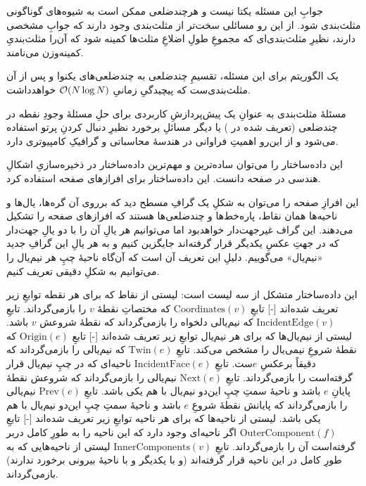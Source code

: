 جوابِ این مسئله یکتا نیست و هرچندضلعی ممکن است به شیوه‌های گوناگونی مثلث‌بندی شود. از این رو مسائلی سخت‌تر از مثلث‌بندی وجود دارند که جوابِ مشخصی دارند، نظیرِ مثلث‌بندی‌ای که مجموعِ طولِ اضلاعِ مثلث‌ها کمینه شود که آن‌را مثلث‌بندیِ کمینه‌وزن می‌نامند.  

 یک الگوریتم برای این مسئله، تقسیمِ چندضلعی به چندضلعی‌های یکنوا و پس از آن مثلث‌بندی‌ست که پیچیدگیِ زمانیِ
$\mathcal{O}(N \log N)$
خواهدداشت.

مسئلهٔ مثلث‌بندی به عنوانِ یک پیش‌پردازشِ کاربردی برای حلِ مسئلهٔ 
وجودِ نقطه در چندضلعی (تعریف شده در ) یا دیگر مسائلِ برخورد نظیرِ دنبال کردنِ پرتو استفاده می‌شود و از این‌رو اهمیتِ فراوانی در هندسهٔ محاسباتی و گرافیکِ کامپیوتری دارد. 


این داده‌ساختار را می‌توان ساده‌ترین و مهم‌ترین داده‌ساختار در ذخیره‌سازیِ اشکالِ هندسی در صفحه دانست. این داده‌ساختار برای افرازهای صفحه استفاده کرد.

این افرازِ صفحه را می‌توان به شکلِ یک گرافِ مسطح دید که برروی آن گره‌ها، یال‌ها و ناحیه‌ها همان نقاط، پاره‌خط‌ها و چندضلعی‌ها هستند که افرازهای صفحه را تشکیل می‌دهند. این گراف غیرجهت‌دار خواهدبود اما می‌توانیم هر یالِ آن را با دو یالِ جهت‌دار که در جهتِ عکسِ یکدیگر قرار گرفته‌اند جایگزین کنیم و به هر یالِ این گرافِ جدید «نیم‌یال» می‌گوییم. دلیلِ این تعریف آن است که آن‌گاه ناحیهٔ چپِ هر نیم‌یال را می‌توانیم به شکلِ دقیقی تعریف کنیم.

این داده‌ساختار متشکل از سه لیست است:
     لیستی از نقاط که برای هر نقطه توابعِ زیر تعریف شده‌اند
    [-]
         تابعِ $\mathrm{Coordinates}(v)$ که مختصاتِ نقطهٔ $v$ را بازمی‌گرداند.
         تابعِ $\mathrm{IncidentEdge}(v)$ که نیم‌یالی دلخواه را بازمی‌گرداند که نقطهٔ شروعش $v$ باشد. 
     لیستی از نیم‌یال‌ها که برای هر نیم‌یال توابعِ زیر تعریف شده‌اند
    [-]
         تابعِ $\mathrm{Origin}(e)$ که نقطهٔ شروعِ نیمی‌یال را مشخص می‌کند.
         تابعِ $\mathrm{Twin}(e)$ که نیم‌یالی را بازمی‌گرداند که دقیقاً برعکسِ $e$ست.
         تابعِ $\mathrm{IncidentFace}(e)$ ناحیه‌ای که در چپِ نیم‌یال قرار گرفته‌است را بازمی‌گرداند.
         تابعِ $\mathrm{Next}(e)$ نیم‌یالی را بازمی‌گرداند که شروعش نقطهٔ پایانِ $e$ باشد و ناحیهٔ سمتِ چپِ این‌دو نیم‌یال با هم یکی باشد.
         تابعِ $\mathrm{Prev}(e)$ نیم‌یالی را بازمی‌گرداند که پایانش نقطهٔ شروعِ $e$ باشد و ناحیهٔ سمتِ چپِ این‌دو نیم‌یال با هم یکی باشد.
     لیستی از ناحیه‌ها که برای هر ناحیه توابعِ زیر تعریف شده‌اند
    [-]
         تابعِ $\mathrm{OuterComponent}(f)$ اگر ناحیه‌ای وجود دارد که این ناحیه را به طورِ کامل دربر گرفته‌است آن را بازمی‌گرداند.
         تابعِ $\mathrm{InnerComponents}(v)$ لیستی از ناحیه‌هایی که به طورِ کامل در این ناحیه قرار گرفته‌اند (و با یکدیگر و با ناحیهٔ بیرونی برخورد ندارند) بازمی‌گرداند.

